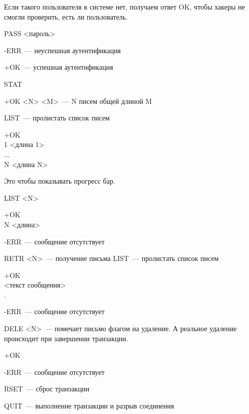 Если такого пользователя в системе нет, получаем ответ OK, чтобы хакеры не смогли проверить, есть ли пользователь.

PASS <пароль>
\begin{MyItemize}
    \item -ERR~--- неуспешная аутентификация
    \item +OK~--- успешная аутентификация
\end{MyItemize}

STAT
\begin{MyItemize}
    \item +OK <N> <M>~--- N писем общей длиной M
\end{MyItemize}

LIST~--- пролистать список писем
\begin{MyItemize}
    \item +OK\\
    1 <длина 1>\\
    ...\\
    N <длина N>
\end{MyItemize}

Это чтобы показывать прогресс бар.


LIST <N>
\begin{MyItemize}
    \item +OK\\
    N <длина>
    \item -ERR~--- сообщение отсутствует
\end{MyItemize}

RETR <N>~--- получение письма
LIST~--- пролистать список писем
\begin{MyItemize}
    \item +OK\\
    <текст сообщения>\\
    .
    \item -ERR~--- сообщение отсутствует
\end{MyItemize}

DELE <N>~--- помечает письмо флагом на удаление. А реальное удаление происходит при завершении транзакции.
\begin{MyItemize}
    \item +OK
    \item -ERR~--- сообщение отсутствует
\end{MyItemize}

RSET~--- сброс транзакции

QUIT~--- выполнение транзакции и разрыв соединения

